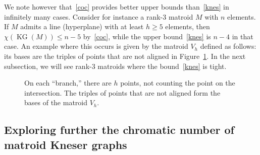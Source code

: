 \documentclass[12pt]{amsart}
\theoremstyle{plain}
\theoremstyle{definition}
\theoremstyle{remark}
\renewcommand{\le}{\leqslant}
\renewcommand{\geq}{\geqslant}
\def \KG {\operatorname{KG}}
\begin{document}
We note however that~\ref{coc} provides better upper bounds than~\ref{knes}  in infinitely many cases. Consider for instance a rank-$3$ matroid $M$ with $n$ elements. If $M$ admits a line (hyperplane) with at least $h\geq 5 $ elements, then $\chi(\KG(M)) \le n-5$ by~\ref{coc}, while the upper bound~\ref{knes} is $n-4$ in that case. An example where this occurs is given by the matroid $V_h$ defined as follows: its bases are the triples of points that are not aligned in Figure~\ref{fig:vh}. 
In the next subsection, we will see rank-$3$ matroids where the bound~\ref{knes} is tight.

\begin{figure}
\caption{On each ``branch,'' there are $h$ points, not counting the point on the intersection. The triples of points that are not aligned form the bases of the matroid $V_h$.\label{fig:vh}}
\end{figure}


\subsection{Exploring further the chromatic number of matroid Kneser graphs}
\end{document}
